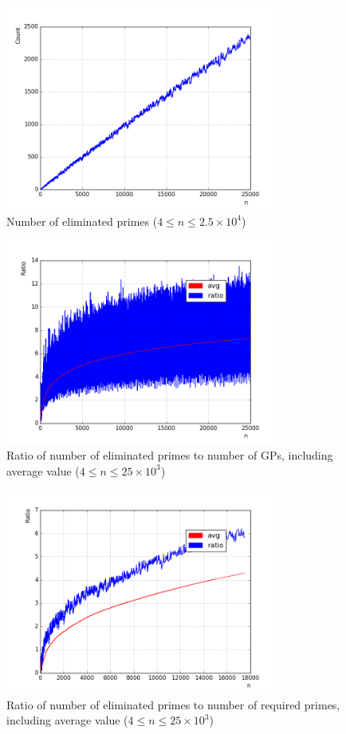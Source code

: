 \documentclass[10pt,twocolumn]{article}
\begin{document}
\begin{figure}[!ht]
\centering
\captionsetup{justification=centering}
\includegraphics[width=9cm]{f_number_of_eliminated_primes}
\caption[caption]{Number of eliminated primes ($4 \leq n \leq 2.5 \times 10^4$)}
\label{fig:numberofeliminatedprimes}
\end{figure}

\begin{figure}[!ht]
\centering
\captionsetup{justification=centering}
\includegraphics[width=9cm]{f_eliminated_primes_to_partitions}
\caption[caption]{Ratio of number of eliminated primes to number of GPs, including average value ($4 \leq n \leq 25 \times 10^3$)}
\label{fig:numberofeliminatedprimestopartitions}
\end{figure}

\begin{figure}[!ht]
\centering
\captionsetup{justification=centering}
\includegraphics[width=9cm]{f_eliminated_primes_to_req_primes}
\caption[caption]{Ratio of number of eliminated primes to number of required primes, including average value ($4 \leq n \leq 25 \times 10^3$)}
\label{fig:numberofeliminatedprimestorequiredprimes}
\end{figure}
\end{document}
